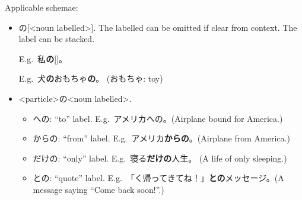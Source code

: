 \documentclass[../nihongo-gakushuu-kyouzai.tex]{subfiles}
\begin{document}
Applicable schemae:
\begin{itemize}
    \item <noun label>の[<noun labelled>]. The labelled can be omitted if clear from context. The label can be stacked.

    E.g.\ 私\textbf{の}[]。

    E.g.\ 犬\textbf{の}おもちゃ\textbf{の}。 (おもちゃ: toy)
    \item <particle>の<noun labelled>.
    \begin{itemize}
        \item への: ``to'' label. E.g.\ アメリカへの。(Airplane bound for America.)
        \item からの: ``from'' label. E.g.\ アメリカ\textbf{からの}。(Airplane from America.)
        \item だけの: ``only'' label. E.g.\ 寝る\textbf{だけの}人生。 (A life of only sleeping.)
        \item との: ``quote'' label. E.g.\ 「く帰ってきてね！」\textbf{との}メッセージ。(A message saying ``Come back soon!''.)
    \end{itemize}
\end{itemize}
\end{document}
